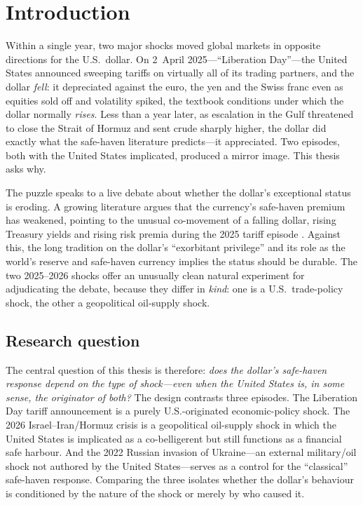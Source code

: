 
\chapter{Introduction}
\label{ch:introduction}

Within a single year, two major shocks moved global markets in opposite directions for the
U.S.\ dollar. On 2~April 2025---``Liberation Day''---the United States announced sweeping
tariffs on virtually all of its trading partners, and the dollar \emph{fell}: it depreciated
against the euro, the yen and the Swiss franc even as equities sold off and volatility
spiked, the textbook conditions under which the dollar normally \emph{rises}. Less than a
year later, as escalation in the Gulf threatened to close the Strait of Hormuz and sent
crude sharply higher, the dollar did exactly what the safe-haven literature predicts---it
appreciated. Two episodes, both with the United States implicated, produced a mirror image.
This thesis asks why.

The puzzle speaks to a live debate about whether the dollar's exceptional status is eroding.
A growing literature argues that the currency's safe-haven premium has weakened, pointing to
the unusual co-movement of a falling dollar, rising Treasury yields and rising risk premia
during the 2025 tariff episode \parencite{corsetti2025,kamin2025,obstfeld2023,jiang2026}.
Against this, the long tradition on the dollar's ``exorbitant privilege'' and its role as the
world's reserve and safe-haven currency \parencite{gourinchasrey2005,habib2012,ranaldo2010}
implies the status should be durable. The two 2025--2026 shocks offer an unusually clean
natural experiment for adjudicating the debate, because they differ in \emph{kind}: one is a
U.S.\ trade-policy shock, the other a geopolitical oil-supply shock.

\section*{Research question}

The central question of this thesis is therefore: \emph{does the dollar's safe-haven
response depend on the type of shock---even when the United States is, in some sense, the
originator of both?} The design contrasts three episodes. The Liberation Day tariff
announcement is a purely U.S.-originated economic-policy shock. The 2026 Israel--Iran/Hormuz
crisis is a geopolitical oil-supply shock in which the United States is implicated as a
co-belligerent but still functions as a financial safe harbour. And the 2022 Russian
invasion of Ukraine---an external military/oil shock not authored by the United
States---serves as a control for the ``classical'' safe-haven response. Comparing the three
isolates whether the dollar's behaviour is conditioned by the nature of the shock or merely
by who caused it.

